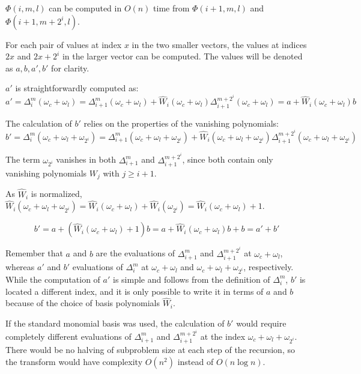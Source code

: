 $\Phi(i, m, l)$ can be computed in $O(n)$ time from $\Phi(i + 1, m, l)$ and $\Phi(i + 1, m + 2^i, l)$.

For each pair of values at index $x$ in the two smaller vectors, the values at indices $2x$ and $2x + 2^i$ in the larger vector can be computed. The values will be denoted as $a, b, a', b'$ for clarity.

$a'$ is straightforwardly computed as:
\begin{equation}a' = \Delta_i^m(\omega_c + \omega_l) = \Delta_{i+1}^m(\omega_c + \omega_l) + \hat{W}_i(\omega_c + \omega_l) \Delta_{i+1}^{m + 2^i}(\omega_c + \omega_l) = a + \hat{W}_i(\omega_c + \omega_l) b\end{equation}

The calculation of $b'$ relies on the properties of the vanishing polynomials:
\begin{equation}b' = \Delta_i^{m}(\omega_c + \omega_l + \omega_{2^i}) = \Delta_{i+1}^m(\omega_c + \omega_l + \omega_{2^i}) + \hat{W}_i(\omega_c + \omega_l + \omega_{2^i}) \Delta_{i+1}^{m + 2^i}(\omega_c + \omega_l + \omega_{2^i})\label{eq:1}\end{equation}

The term $\omega_{2^i}$ vanishes in both $\Delta_{i+1}^m$ and $\Delta_{i+1}^{m + 2^i}$, since both contain only vanishing polynomials $W_j$ with $j \geq i + 1$.

As $\hat{W}_i$ is normalized, $\hat{W}_i(\omega_c + \omega_l + \omega_{2^i}) = \hat{W}_i(\omega_c + \omega_l) + \hat{W}_i(\omega_{2^i}) = \hat{W}_i(\omega_c + \omega_l) + 1$.

\begin{equation}b' = a + (\hat{W}_i(\omega_c + \omega_l) + 1) b = a + \hat{W}_i(\omega_c + \omega_l) b + b = a' + b'\label{eq:1-simplified}\end{equation}

Remember that $a$ and $b$ are the evaluations of $\Delta_{i+1}^m$ and $\Delta_{i+1}^{m + 2^i}$ at $\omega_c + \omega_l$, whereas $a'$ and $b'$ evaluations of $\Delta_i^m$ at $\omega_c + \omega_l$ and $\omega_c + \omega_l + \omega_{2^i}$, respectively.
While the computation of $a'$ is simple and follows from the definition of $\Delta_i^m$, $b'$ is located a different index, and it is only possible to write it in terms of $a$ and $b$ because of the choice of basis polynomials $\hat{W}_i$.

If the standard monomial basis was used, the calculation of $b'$ would require completely different evaluations of $\Delta_{i+1}^m$ and $\Delta_{i+1}^{m + 2^i}$ at the index $\omega_c + \omega_l + \omega_{2^i}$.
There would be no halving of subproblem size at each step of the recursion, so the transform would have complexity $O(n^2)$ instead of $O(n \log n)$.

